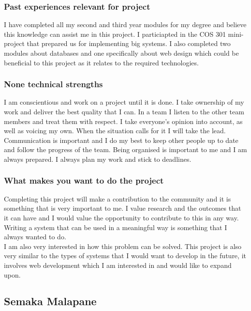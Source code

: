\documentclass[hidelinks, 12pt, oneside]{article}
\begin{document}
\subsubsection{Past experiences relevant for project}
I have completed all my second and third year modules for my degree and believe this knowledge can assist me in this project. I particiapted in the COS 301 mini-project that prepared us for implementing big systems. I also completed two modules about databases and one specifically about web design which could be beneficial to this project as it relates to the required technologies. 
\subsubsection{None technical strengths}
I am conscientious and work on a project until it is done. I take ownership of my work and deliver the best quality that I can. In a team I listen to the other team members and treat them with respect. I take everyone’s opinion into account, as well as voicing my own. When the situation calls for it I will take the lead. Communication is important and I do my best to keep other people up to date and follow the progress of the team. Being organised is important to me and I am always prepared. I always plan my work and stick to deadlines.
\subsubsection{What makes you want to do the project}
Completing this project will make a contribution to the community and it is something that is very important to me. I value research and the outcomes that it can have and I would value the opportunity to contribute to this in any way. Writing a system that can be used in a meaningful way is something that I always wanted to do. 
\\
I am also very interested in how this problem can be solved. This project is also very similar to the types of systems that I would want to develop in the future, it involves web development which I am interested in and would like to expand upon.

\subsection{Semaka Malapane}
\end{document}
